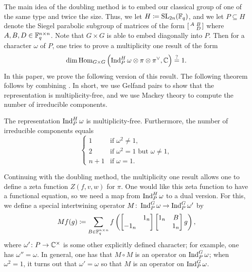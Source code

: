 \documentclass{amsart}
\begin{document}
The main idea of the doubling method is to embed our classical group of one of the same type and twice the size. Thus, we let $H\coloneqq\operatorname{SL}_{2n}(\mathbb F_q)$, and we let $P\subseteq H$ denote the Siegel parabolic subgroup of matrices of the form $\begin{bsmallmatrix}
    A & B \\ & D
\end{bsmallmatrix}$ where $A,B,D\in\mathbb F_q^{n\times n}$. Note that $G\times G$ is able to embed diagonally into $P$. Then for a character $\omega$ of $P$, one tries to prove a multiplicity one result of the form
\[\dim\operatorname{Hom}_{G\times G}\left(\operatorname{Ind}_P^H\omega\otimes\pi\otimes\pi^\lor,\mathbb C\right)\stackrel?=1.\]
In this paper, we prove the following version of this result. The following theorem follows by combining . In short, we use Gelfand pairs to show that the representation is multiplicity-free, and we use Mackey theory to compute the number of irreducible components.
\begin{theorem}
    The representation $\operatorname{Ind}_P^H\omega$ is multiplicity-free. Furthermore, the number of irreducible components equals
    \[\begin{cases}
        1 & \text{if }\omega^2\ne1, \\
        2 & \text{if }\omega^2=1\text{ but }\omega\ne1, \\
        n+1 & \text{if }\omega=1.
    \end{cases}\]
\end{theorem}
Continuing with the doubling method, the multiplicity one result allows one to define a zeta function $Z(f,v,w)$ for $\pi$. One would like this zeta function to have a functional equation, so we need a map from $\operatorname{Ind}_P^H\omega$ to a dual version. For this, we define a special intertwining operator $M\colon\operatorname{Ind}_P^G\omega\to\operatorname{Ind}_P^G\omega'$ by
\[Mf(g)\coloneqq\sum_{B\in\mathbb F_q^{n\times n}}f\left(\begin{bmatrix}
    & 1_n \\ -1_n
\end{bmatrix}\begin{bmatrix}
    1_n & B \\ & 1_n
\end{bmatrix}g\right),\]
where $\omega'\colon P\to\mathbb C^\times$ is some other explicitly defined character; for example, one has $\omega''=\omega$. In general, one has that $M\circ M$ is an operator on $\operatorname{Ind}_P^G\omega$; when $\omega^2=1$, it turns out that $\omega'=\omega$ so that $M$ is an operator on $\operatorname{Ind}_P^G\omega$.
\end{document}
